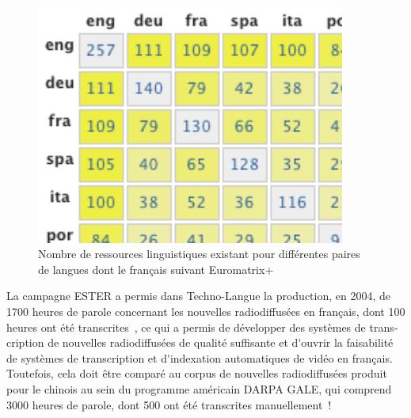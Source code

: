 \documentclass[]{../metanetpaper}
\begin{document}
\begin{french}
\begin{multicols}{2}
\begin{figure}
\begin{center}
\includegraphics[width=4.0in]{../_media/french/french_table2_euromatrix.png}
\caption{Nombre de ressources linguistiques existant pour différentes paires de langues dont le français suivant Euromatrix+}
\label{fig:EuromatrixFrRessource}
\end{center}
\end{figure}

La campagne ESTER a permis dans Techno-Langue la production, en 2004,
de 1700 heures de parole concernant les nouvelles radiodiffusées en
français, dont 100 heures ont été transcrites~\cite{ester}, ce qui a permis de
développer des systèmes de transcription de nouvelles radiodiffusées
de qualité suffisante et d{\mbox '}ouvrir la faisabilité de systèmes de
transcription et d{\mbox '}indexation automatiques de vidéo en
français. Toutefois, cela doit être comparé au corpus de nouvelles
radiodiffusées produit pour le chinois au sein du programme américain
DARPA GALE, qui comprend 3000 heures de parole, dont 500 ont été
transcrites manuellement~\cite{gale}!


\end{multicols}
\end{french}
\end{document}
